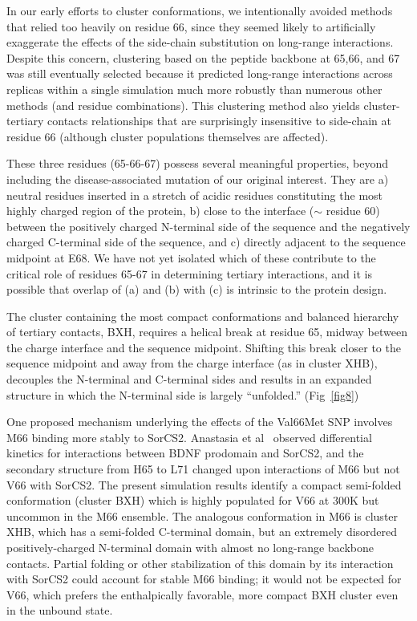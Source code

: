 \documentclass[10pt,letterpaper]{article}
\begin{document}
In our early efforts to cluster conformations, we intentionally avoided methods that relied too heavily on residue 66, since they seemed likely to artificially exaggerate the effects of the side-chain substitution on long-range interactions.  Despite this concern, clustering based on the peptide backbone at  65,66, and 67 was still eventually selected because it predicted long-range interactions across replicas within a single simulation much more robustly than numerous other methods (and residue combinations).  This clustering method also yields cluster-tertiary contacts relationships that are surprisingly insensitive to side-chain at residue 66 (although cluster populations themselves are affected).

These three residues (65-66-67) possess several meaningful properties, beyond including the disease-associated mutation of our original interest. They are a) neutral residues inserted in a stretch of acidic residues constituting the most highly charged region of the protein, b) close to the interface ($\sim$ residue 60) 
between the positively charged N-terminal side of the sequence and the negatively charged C-terminal side of the sequence, and c) directly adjacent to the sequence midpoint at E68.  We have not yet isolated which of these contribute to the critical role of residues 65-67 in determining tertiary interactions, and it is possible that overlap of (a) and (b) with (c) is intrinsic to the protein design.  

The cluster containing the most compact conformations and balanced hierarchy of tertiary contacts, BXH, requires a helical break at residue 65, midway between the charge interface and the sequence midpoint. Shifting this break closer to the sequence midpoint and away from the charge interface (as in cluster XHB), decouples the N-terminal and C-terminal sides and results in an expanded structure in which the N-terminal side is largely ``unfolded.'' (Fig~\ref{fig8})



One proposed mechanism underlying the effects of the Val66Met SNP involves M66 binding more stably to SorCS2.  Anastasia et al~\cite{Anastasia2013} observed differential kinetics for interactions between BDNF prodomain and SorCS2, and the secondary structure from H65 to L71 changed upon interactions of M66 but not V66 with SorCS2.  The present simulation results identify a compact semi-folded conformation (cluster BXH) which is highly populated for V66 at 300K but uncommon in the M66 ensemble.  The analogous conformation in M66 is cluster XHB, which has a semi-folded C-terminal domain, but an extremely disordered positively-charged N-terminal domain with almost no long-range backbone contacts.  Partial folding or other stabilization of this domain by its interaction with SorCS2 could account for stable M66 binding; it would not be expected for V66, which prefers the enthalpically favorable, more compact BXH cluster even in the unbound state.  
\end{document}
